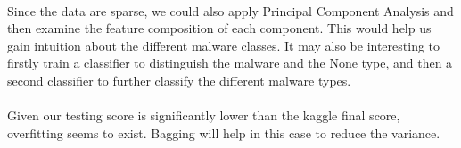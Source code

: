 \documentclass[11pt]{article}
\begin{document}
\paragraph{}Since the data are sparse, we could also apply Principal Component Analysis and then examine the feature composition of each component. This would help us gain intuition about the different malware classes. It may also be interesting to firstly train a classifier to distinguish the malware and the None type, and then a second classifier to further classify the different malware types. 
\paragraph{}Given our testing score is significantly lower than the kaggle final score, overfitting seems to exist. Bagging will help in this case to reduce the variance.
\end{document}
